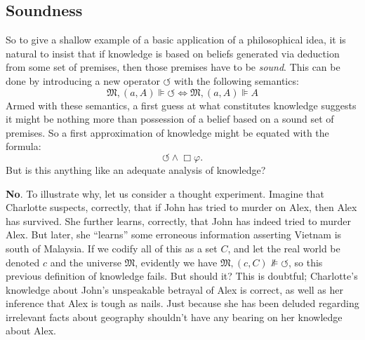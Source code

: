 \documentclass[11pt]{article}
\numberwithin{equation}{subsection}
\renewcommand{\Omega}{\mathfrak{M}}
\renewcommand{\phi}{\varphi}
\begin{document}
\subsection{Soundness}\label{soundness}
So to give a shallow example of a basic application of a philosophical
idea, it is natural to insist that if knowledge is based on beliefs
generated via deduction from some set of premises, then those premises
have to be \emph{sound}. This can be done by introducing a
new operator $\circlearrowleft$ with the following semantics:
\[ \Omega,(a,A)\VDash \circlearrowleft \iff \Omega,(a,A)\VDash A\]
Armed with these semantics, a first guess at what constitutes
knowledge suggests it might be nothing more than possession of a
belief based on a sound set of premises. So a first approximation of
knowledge might be equated with the formula:
$$\circlearrowleft \wedge \Box \phi.$$
But is this anything like an adequate analysis of knowledge?

\textbf{No}. To illustrate why, let us consider a thought
experiment.
Imagine that Charlotte suspects, correctly, that if John has tried to murder
on Alex, then Alex has survived.  She further learns, correctly, that John
has indeed tried to murder Alex.  But later, she ``learns'' some erroneous
information asserting Vietnam is south of Malaysia.  If we codify all of this as
a set $C$, and let the real world be
denoted $c$ and the universe $\Omega$, evidently we have $\Omega, (c, C) \nVDash
\circlearrowleft$, so this previous definition of knowledge fails.  But
should it?  This is doubtful; Charlotte's knowledge about John's unspeakable
betrayal of Alex is correct, as well as her inference that Alex is tough as
nails.  Just because she has been deluded regarding irrelevant facts
about geography shouldn't have any bearing on her
knowledge about Alex.
\end{document}

